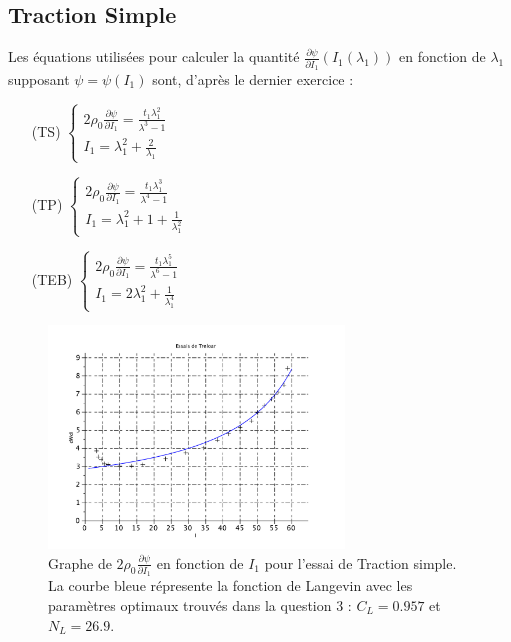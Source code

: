\documentclass[a4paper,11pt]{article}
\begin{document}
\subsection {Traction Simple}
Les équations utilisées pour calculer la quantité $\frac{\partial\psi}{\partial I_1} (I_1(\lambda_1))$ en fonction de $\lambda_1$ supposant $\psi = \psi(I_1)$ sont, d'après le dernier exercice :
\begin{enumerate}
\item[(TS)]
$
\begin{cases}
2 \rho_0 \frac{\partial\psi}{\partial I_1} = \frac{t_1\lambda_1^2}{\lambda^3-1}\\
I_1 = \lambda_1^2 + \frac{2}{\lambda_1}
\end{cases}
$
\item[(TP)]
$
\begin{cases}
2 \rho_0 \frac{\partial\psi}{\partial I_1} = \frac{t_1\lambda_1^3}{\lambda^4-1}\\
I_1 = \lambda_1^2 + 1 + \frac{1}{\lambda_1^2}
\end{cases}
$
\item[(TEB)]
$
\begin{cases}
2 \rho_0 \frac{\partial\psi}{\partial I_1} = \frac{t_1\lambda_1^5}{\lambda^6-1}\\
I_1 = 2\lambda_1^2 + \frac{1}{\lambda_1^4}
\end{cases}
$
\end{enumerate}

\begin{figure}[!ht]
\centering
\includegraphics[width=0.7\textwidth]{scilab_prof/q31.pdf}
\caption{Graphe de $2 \rho_0 \frac{\partial\psi}{\partial I_1}$ en fonction de $I_1$ pour l'essai de Traction simple. La courbe bleue répresente la fonction de Langevin avec les paramètres optimaux trouvés dans la question 3 : $C_L = 0.957$ et $N_L=26.9$.}
\label{fig:31}
\end{figure}
\end{document}
